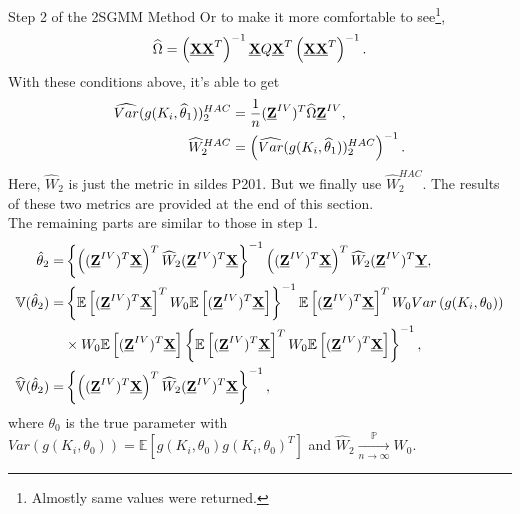 \documentclass{article}
\theoremstyle{definition}
\newcommand{\limitP}{\mathop{\longrightarrow}\limits_{n \rightarrow \infty}^{\mathbb{P}}}
\begin{document}
\begin{itembox}[1]{{\color{blue} Step 2 of the 2SGMM Method}}
Or to make it more comfortable to see\footnote{Almostly same values were returned.},\\
\begin{equation*}
	\widehat{\Omega} = \left(\textbf{\underline{X}}\textbf{\underline{X}}^T \right)^{-1} \textbf{\underline{X}} Q \textbf{\underline{X}}^T \left(\textbf{\underline{X}}\textbf{\underline{X}}^T \right)^{-1}.
\end{equation*}
With these conditions above, it's able to get\\
\begin{align*}
	\widehat{Var}(g(K_i, \widehat{\theta}_1))_2^{HAC} & 
	= \frac{1}{n} (\textbf{\underline{Z}}^{IV})^T \widehat{\Omega} \textbf{\underline{Z}}^{IV},\\
	\widehat{W}_2^{HAC} & 
	= \left(\widehat{Var}(g(K_i, \widehat{\theta}_1))_2^{HAC} \right)^{-1}.
\end{align*}
Here, $\widehat{W}_2$ is just the metric in sildes P201. But we finally use $\widehat{W}_2^{HAC}$. The results of these two metrics are provided at the end of this section.\\
The remaining parts are similar to those in step 1.\\
\begin{align*}
	\hat{\theta}_2  = & \left\{\left((\textbf{\underline{Z}}^{IV})^T \textbf{\underline{X}} \right)^T \widehat{W}_2 (\textbf{\underline{Z}}^{IV})^T \textbf{\underline{X}} \right\}^{-1} \left((\textbf{\underline{Z}}^{IV})^T \textbf{\underline{X}} \right)^T \widehat{W}_2 (\textbf{\underline{Z}}^{IV})^T \textbf{\underline{Y}},\\
	\mathbb{V}(\hat{\theta}_2) = 
	& \left\{ \mathbb{E}\left[ (\textbf{\underline{Z}}^{IV})^T \textbf{\underline{X}} \right]^T W_0 \mathbb{E}\left[ (\textbf{\underline{Z}}^{IV})^T \textbf{\underline{X}}\right] \right\}^{-1} \mathbb{E}\left[ (\textbf{\underline{Z}}^{IV})^T \textbf{\underline{X}} \right]^T W_0 Var\left( g(K_i, \theta_0)\right)\\
	& \times W_0 \mathbb{E}\left[ (\textbf{\underline{Z}}^{IV})^T \textbf{\underline{X}} \right] \left\{ \mathbb{E}\left[ (\textbf{\underline{Z}}^{IV})^T \textbf{\underline{X}} \right]^T W_0 \mathbb{E}\left[ (\textbf{\underline{Z}}^{IV})^T \textbf{\underline{X}} \right] \right\}^{-1},\\
	 \widehat{\mathbb{V}}(\hat{\theta}_2) = 
	 & \left\{\left((\textbf{\underline{Z}}^{IV})^T \textbf{\underline{X}} \right)^T \widehat{W}_2 (\textbf{\underline{Z}}^{IV})^T \textbf{\underline{X}} \right\}^{-1},
\end{align*}
where $\theta_0$ is the true parameter with $Var\left( g(K_i, \theta_0)\right) = \mathbb{E}\left[g(K_i, \theta_0)g(K_i, \theta_0)^T \right]$ and $\widehat{W}_2 \limitP W_0$.
\end{itembox}
\end{document}
